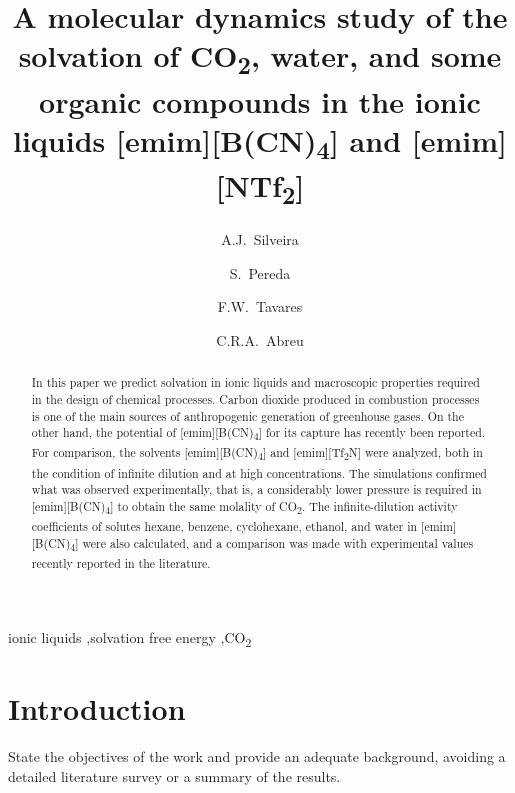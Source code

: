\documentclass[3p,twocolumn]{elsarticle}
\begin{document}
\begin{frontmatter}

\title{A molecular dynamics study of the solvation of CO\textsubscript{2}, water, and some organic compounds in the ionic liquids [emim][B(CN)\textsubscript{4}] and [emim][NTf\textsubscript{2}]}

\author[rvt]{A.J.~Silveira}
\author[rvt]{S.~Pereda}
\author[focal,els]{F.W.~Tavares}
\author[focal]{C.R.A.~Abreu}

\address[rvt]{Planta Piloto de Ingenier\'ia Qu\'imica, PLAPIQUI, Universidad Nacional del Sur,Camino La Carrindanga Km 7-CC: 717, Bah\'ia Blanca, Argentina}
\address[focal]{Chemical Engineering Department, Escola de Qu\'imica, Universidade Federal do Rio de Janeiro,Rio de Janeiro, RJ 21941-909, Brazil}
\address[els]{COPPE, Universidade Federal do Rio de Janeiro, Rio de Janeiro, RJ 21941-909, Brazil}


\begin{abstract}
In this paper we predict solvation in ionic liquids and macroscopic properties required in the design of chemical processes. Carbon dioxide produced in combustion processes is one of the main sources of anthropogenic generation of greenhouse gases. On the other hand, the potential of [emim][B(CN)\textsubscript{4}] for its capture has recently been reported. For comparison, the solvents [emim][B(CN)\textsubscript{4}] and [emim][Tf\textsubscript{2}N] were analyzed, both in the condition of infinite dilution and at high concentrations. The simulations confirmed what was observed experimentally, that is, a considerably lower pressure is required in [emim][B(CN)\textsubscript{4}] to obtain the same molality of CO\textsubscript{2}. The infinite-dilution activity coefficients of solutes hexane, benzene, cyclohexane, ethanol, and water in [emim][B(CN)\textsubscript{4}] were also calculated, and a comparison was made with experimental values recently reported in the literature.
\end{abstract}

\begin{keyword}
ionic liquids \sep solvation free energy \sep  CO\textsubscript{2} 
\end{keyword}

\end{frontmatter}

\linenumbers

\section{Introduction}
State the objectives of the work and provide an adequate background, avoiding a detailed literature survey or a summary of the results.
\end{document}
